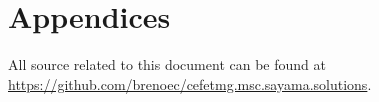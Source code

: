 
\section*{Appendices}

All source related to this document can be found at
\url{https://github.com/brenoec/cefetmg.msc.sayama.solutions}.
